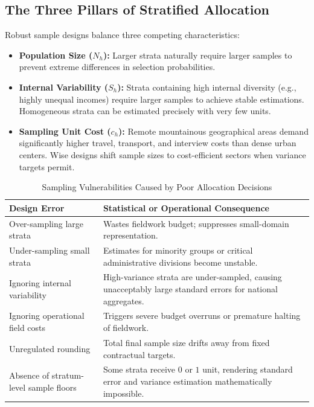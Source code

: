 \documentclass[11pt, a4paper]{article}
\begin{document}
\subsection{The Three Pillars of Stratified Allocation}
Robust sample designs balance three competing characteristics:
\begin{itemize}
    \item \textbf{Population Size ($N_h$):} Larger strata naturally require larger samples to prevent extreme differences in selection probabilities.
    \item \textbf{Internal Variability ($S_h$):} Strata containing high internal diversity (e.g., highly unequal incomes) require larger samples to achieve stable estimations. Homogeneous strata can be estimated precisely with very few units.
    \item \textbf{Sampling Unit Cost ($c_h$):} Remote mountainous geographical areas demand significantly higher travel, transport, and interview costs than dense urban centers. Wise designs shift sample sizes to cost-efficient sectors when variance targets permit.
\end{itemize}

\begin{table}[htbp]
\centering
\caption{Sampling Vulnerabilities Caused by Poor Allocation Decisions}
\label{tab:vulnerabilities}
\begin{tabularx}{\textwidth}{p{4.5cm} X}
\toprule
\textbf{Design Error} & \textbf{Statistical or Operational Consequence} \\
\midrule
Over-sampling large strata & Wastes fieldwork budget; suppresses small-domain representation. \\
Under-sampling small strata & Estimates for minority groups or critical administrative divisions become unstable. \\
Ignoring internal variability & High-variance strata are under-sampled, causing unacceptably large standard errors for national aggregates. \\
Ignoring operational field costs & Triggers severe budget overruns or premature halting of fieldwork. \\
Unregulated rounding & Total final sample size drifts away from fixed contractual targets. \\
Absence of stratum-level sample floors & Some strata receive $0$ or $1$ unit, rendering standard error and variance estimation mathematically impossible. \\
\bottomrule
\end{tabularx}
\end{table}
\end{document}
